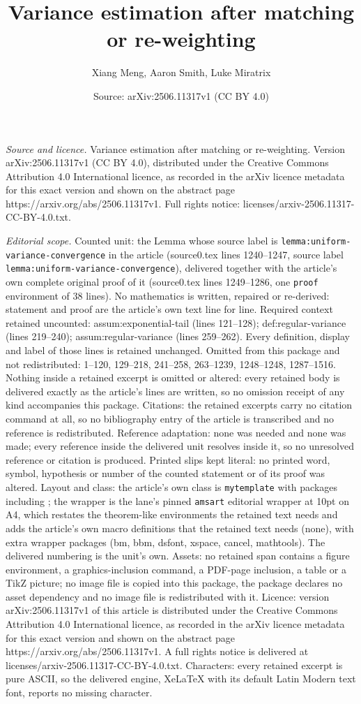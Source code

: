 \documentclass[10pt,a4paper]{amsart}
\title[Variance estimation after matching or re-weighting]{Variance estimation after matching or re-weighting}
\author{Xiang Meng, Aaron Smith, Luke Miratrix}
\date{Source: arXiv:2506.11317v1 (CC BY 4.0)}
\begin{document}
\maketitle

\noindent\emph{Source and licence.} Variance estimation after matching or re-weighting. Version arXiv:2506.11317v1 (CC BY 4.0), distributed under the Creative Commons Attribution 4.0 International licence, as recorded in the arXiv licence metadata for this exact version and shown on the abstract page https://arxiv.org/abs/2506.11317v1. Full rights notice: licenses/arxiv-2506.11317-CC-BY-4.0.txt.\par\smallskip

\noindent\textit{Editorial scope.} Counted unit: the Lemma whose source label is \texttt{lemma:uniform-variance-convergence} in the article (source0.tex lines 1240--1247, source label \texttt{lemma:uniform-variance-convergence}), delivered together with the article's own complete original proof of it (source0.tex lines 1249--1286, one \texttt{proof} environment of 38 lines). No mathematics is written, repaired or re-derived: statement and proof are the article's own text line for line. Required context retained uncounted: assum:exponential-tail (lines 121--128); def:regular-variance (lines 219--240); assum:regular-variance (lines 259--262). Every definition, display and label of those lines is retained unchanged. Omitted from this package and not redistributed: 1--120, 129--218, 241--258, 263--1239, 1248--1248, 1287--1516. Nothing inside a retained excerpt is omitted or altered: every retained body is delivered exactly as the article's lines are written, so no omission receipt of any kind accompanies this package. Citations: the retained excerpts carry no citation command at all, so no bibliography entry of the article is transcribed and no reference is redistributed. Reference adaptation: none was needed and none was made; every reference inside the delivered unit resolves inside it, so no unresolved reference or citation is produced. Printed slips kept literal: no printed word, symbol, hypothesis or number of the counted statement or of its proof was altered. Layout and class: the article's own class is \texttt{mytemplate} with packages including ; the wrapper is the lane's pinned \texttt{amsart} editorial wrapper at 10pt on A4, which restates the theorem-like environments the retained text needs and adds the article's own macro definitions that the retained text needs (none), with extra wrapper packages (bm, bbm, dsfont, xspace, cancel, mathtools). The delivered numbering is the unit's own. Assets: no retained span contains a figure environment, a graphics-inclusion command, a PDF-page inclusion, a table or a TikZ picture; no image file is copied into this package, the package declares no asset dependency and no image file is redistributed with it. Licence: version arXiv:2506.11317v1 of this article is distributed under the Creative Commons Attribution 4.0 International licence, as recorded in the arXiv licence metadata for this exact version and shown on the abstract page https://arxiv.org/abs/2506.11317v1. A full rights notice is delivered at licenses/arxiv-2506.11317-CC-BY-4.0.txt. Characters: every retained excerpt is pure ASCII, so the delivered engine, XeLaTeX with its default Latin Modern text font, reports no missing character.
\end{document}
